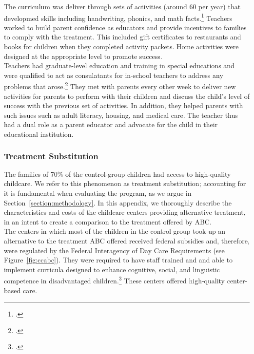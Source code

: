 \begin{appendices}
\noindent The curriculum was deliver through sets of activities (around 60 per year) that developmed skills including handwriting, phonics, and math facts.\footnote{\cite{Campbell-Ramey_1989_Preschool-vs-School-age}.} Teachers worked to build parent confidence as educators and provide incentives to families to comply with the treatment. This included gift certificates to restaurants and books for children when they completed activity packets. Home activities were designed at the appropriate level to promote success.\\

\noindent Teachers had graduate-level education and training in special educations and were qualified to act as consulatants for in-school teachers to address any problems that arose.\footnote{\cite{Ramey_Campbell_1991_childreninpoverty}.} They met with parents every other week to deliver new activities for parents to perform with their children and discuss the child's level of success with the previous set of activities. In addition, they helped parents with such issues such as adult literacy, housing, and medical care. The teacher thus had a dual role as a parent educator and advocate for the child in their educational institution.

\subsubsection{Treatment Substitution}

\noindent The families of $70\%$ of the control-group children had access to high-quality childcare. We refer to this phenomenon as treatment substitution; accounting for it is fundamental when evaluating the program, as we argue in Section~\ref{section:methodology}. In this appendix, we thoroughly describe the characteristics and costs of the childcare centers providing alternative treatment, in an intent to create a comparison to the treatment offered by ABC.\\

\noindent The centers in which most of the children in the control group took-up an alternative to the treatment ABC offered received federal subsidies and, therefore, were regulated by the Federal Interagency of Day Care Requirements (see Figure~\ref{fig:ccabc}). They were required to have staff trained and and able to implement curricula designed to enhance cognitive, social, and linguistic competence in disadvantaged children.\footnote{\citet{Burchinal_etal_1989_CD_Daycare-Pre-K-Dev}.} These centers offered high-quality center-based care.


\end{appendices}
